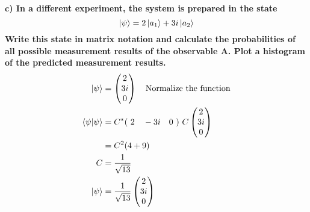 \documentclass[paper=a4, fontsize=11pt]{scrartcl} %
\numberwithin{equation}{section} %
\numberwithin{figure}{section} %
\numberwithin{table}{section} %
\begin{document}
\begin{center}
\end{center}
\textbf{c) In a different experiment, the system is prepared in the state}\\
$$
\ket{\psi} = 2\ket{a_1} +3i\ket{a_2}
$$
\textbf{Write this state in matrix notation and calculate the probabilities of all possible measurement
results of the observable A. Plot a histogram of the predicted measurement results.}
\begin{align*}
\ket{\psi} & = 
\begin{pmatrix}
2\\3i\\0
\end{pmatrix} \quad \text{Normalize the function} \\
\braket{\psi|\psi} & = C^* (\ 2\quad -3i\quad 0\ )\ 
C \begin{pmatrix}
2\\ 3i\\ 0
\end{pmatrix}\\
& = C^2 (4 + 9)\\
C & = \frac{1}{\sqrt{13}} \\
\ket{\psi} & = \frac{1}{\sqrt{13}}
\begin{pmatrix}
2\\3i \\ 0
\end{pmatrix}
\end{align*}
\end{document}
